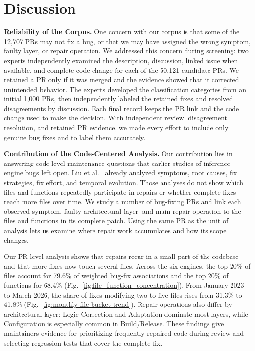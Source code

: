\section{Discussion}

\noindent\textbf{Reliability of the Corpus.}
One concern with our corpus is that some of the 12,707 PRs may not fix a bug, or that we may have assigned the wrong symptom, faulty layer, or repair operation.
We addressed this concern during screening: two experts independently examined the description, discussion, linked issue when available, and complete code change for each of the 50,121 candidate PRs. We retained a PR only if it was merged and the evidence showed that it corrected unintended behavior. The experts developed the classification categories from an initial 1,000 PRs, then independently labeled the retained fixes and resolved disagreements by discussion. Each final record keeps the PR link and the code change used to make the decision. With independent review, disagreement resolution, and retained PR evidence, we made every effort to include only genuine bug fixes and to label them accurately.

\noindent\textbf{Contribution of the Code-Centered Analysis.}
Our contribution lies in answering code-level maintenance questions that earlier studies of inference-engine bugs left open. Liu et al.~\cite{liu2026firstlook} already analyzed symptoms, root causes, fix strategies, fix effort, and temporal evolution. Those analyses do not show which files and functions repeatedly participate in repairs or whether complete fixes reach more files over time. We study a number of bug-fixing PRs and link each observed symptom, faulty architectural layer, and main repair operation to the files and functions in its complete patch. Using the same PR as the unit of analysis lets us examine where repair work accumulates and how its scope changes.

Our PR-level analysis shows that repairs recur in a small part of the codebase and that more fixes now touch several files. Across the six engines, the top 20\% of files account for 79.6\% of weighted bug-fix associations and the top 20\% of functions for 68.4\% (Fig.~\ref{fig:file_function_concentration}). From January 2023 to March 2026, the share of fixes modifying two to five files rises from 31.3\% to 41.8\% (Fig.~\ref{fig:monthly-file-bucket-trend}). Repair operations also differ by architectural layer: Logic Correction and Adaptation dominate most layers, while Configuration is especially common in Build/Release. These findings give maintainers evidence for prioritizing frequently repaired code during review and selecting regression tests that cover the complete fix.

